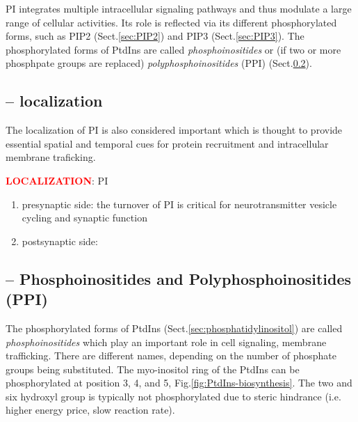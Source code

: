PI integrates multiple intracellular signaling pathways and thus modulate a
large range of cellular activities. Its role is reflected via its different
phosphorylated forms, such as PIP2 (Sect.\ref{sec:PIP2}) and PIP3
(Sect.\ref{sec:PIP3}). The phosphorylated forms of PtdIns are called {\it
phosphoinositides} or (if two or more phosphpate groups are replaced) {\it
polyphosphoinositides} (PPI) (Sect.\ref{sec:phosphoinositides}).

\subsection{-- localization}
\label{sec:PtdIns-localization}
\label{sec:PI-localization}

The localization of PI is also considered important which is thought to provide
essential spatial and temporal cues for protein recruitment and intracellular
membrane traficking.

\textcolor{red}{\bf LOCALIZATION}: PI
\begin{enumerate}
  
  \item presynaptic side: the turnover of PI is critical for neurotransmitter
  vesicle cycling and synaptic function
  
  \item postsynaptic side:
\end{enumerate}


\subsection{-- Phosphoinositides and Polyphosphoinositides (PPI)}
\label{sec:phosphoinositides}
\label{sec:polyphosphoinositides}
\label{sec:PPI}

The phosphorylated forms of PtdIns (Sect.\ref{sec:phosphatidylinositol}) are
called {\it phosphoinositides} which play an important role in cell signaling,
membrane trafficking. There are different names, depending on the number of
phosphate groups being substituted. 
The myo-inositol ring of the PtdIns can be phosphorylated at position 3, 4, and
5, Fig.\ref{fig:PtdIns-biosynthesis}. The two and six hydroxyl group is
typically not phosphorylated due to steric hindrance (i.e. higher energy price,
slow reaction rate).

